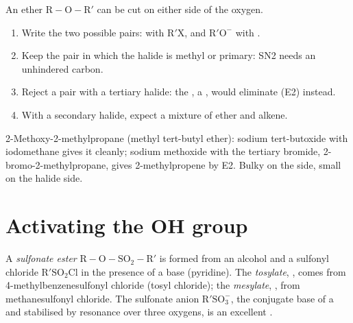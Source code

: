 \begin{method}\label{met:b1:alcohol-activation:williamson-choice}
An ether $\mathrm{R{-}O{-}R'}$ can be cut on either side of the oxygen.
\begin{enumerate}
  \item Write the two possible pairs:  with $\mathrm{R'X}$, and
        $\mathrm{R'O^-}$ with .
  \item Keep the pair in which the halide is methyl or primary: SN2 needs
        an unhindered carbon.
  \item Reject a pair with a tertiary halide: the , a ,
        would eliminate (E2) instead.
  \item With a secondary halide, expect a mixture of ether and alkene.
\end{enumerate}
\end{method}

\begin{example}\label{ex:b1:alcohol-activation:williamson}
2-Methoxy-2-methylpropane (methyl tert-butyl ether): sodium tert-butoxide
with iodomethane gives it cleanly; sodium methoxide with the tertiary
bromide, 2-bromo-2-methyl\-propane, gives 2-methylpropene by E2. Bulky on the
 side, small on the halide side.
\end{example}

\section{Activating the OH group}

\begin{definition}\label{def:b1:alcohol-activation:sulfonate}
A \emph{sulfonate ester} $\mathrm{R{-}O{-}SO_2{-}R'}$ is formed
from an alcohol and a sulfonyl chloride $\mathrm{R'SO_2Cl}$ in the presence of a
base (pyridine). The \emph{tosylate}, , comes
from 4-methylbenzenesulfonyl chloride (tosyl chloride); the
\emph{mesylate}, , from methanesulfonyl chloride.
The sulfonate anion $\mathrm{R'SO_3^-}$, the conjugate base of a  and
stabilised by resonance over three oxygens, is an excellent .
\end{definition}

